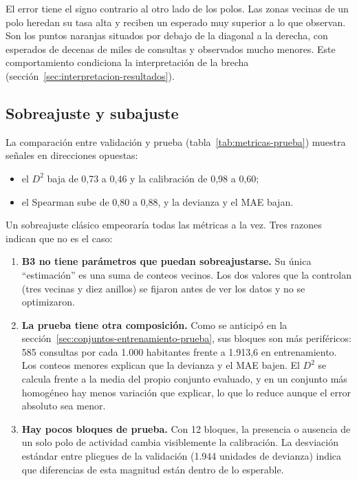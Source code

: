 El error tiene el signo contrario al otro lado de los polos. Las zonas vecinas de un polo
heredan su tasa alta y reciben un esperado muy superior a lo que observan. Son los puntos
naranjas situados por debajo de la diagonal a la derecha, con esperados de decenas de
miles de consultas y observados mucho menores. Este comportamiento condiciona la
interpretación de la brecha (sección~\ref{sec:interpretacion-resultados}).

\subsection{Sobreajuste y subajuste}
\label{sec:sobreajuste}

La comparación entre validación y prueba (tabla~\ref{tab:metricas-prueba}) muestra señales
en direcciones opuestas:
\begin{itemize}
  \item el $D^2$ baja de 0,73 a 0,46 y la calibración de 0,98 a 0,60;
  \item el Spearman sube de 0,80 a 0,88, y la devianza y el MAE bajan.
\end{itemize}
Un sobreajuste clásico empeoraría todas las métricas a la vez. Tres razones indican que no
es el caso:
\begin{enumerate}
  \item \textbf{B3 no tiene parámetros que puedan sobreajustarse.} Su única ``estimación''
        es una suma de conteos vecinos. Los dos valores que la controlan (tres vecinas y
        diez anillos) se fijaron antes de ver los datos y no se optimizaron.
  \item \textbf{La prueba tiene otra composición.} Como se anticipó en la
        sección~\ref{sec:conjuntos-entrenamiento-prueba}, sus bloques son más periféricos:
        585 consultas por cada 1.000 habitantes frente a 1.913,6 en entrenamiento. Los
        conteos menores explican que la devianza y el MAE bajen. El $D^2$ se calcula frente
        a la media del propio conjunto evaluado, y en un conjunto más homogéneo hay menos
        variación que explicar, lo que lo reduce aunque el error absoluto sea menor.
  \item \textbf{Hay pocos bloques de prueba.} Con 12 bloques, la presencia o ausencia de un
        solo polo de actividad cambia visiblemente la calibración. La desviación estándar
        entre pliegues de la validación (1.944 unidades de devianza) indica que diferencias
        de esta magnitud están dentro de lo esperable.
\end{enumerate}

